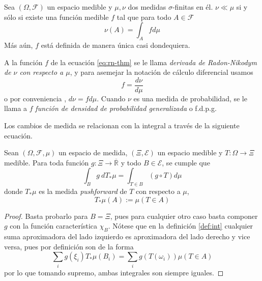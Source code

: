 \documentclass[main.tex]{subfiles}
\begin{document}
\begin{theorem}
Sea $(\Omega, \mathcal{F})$ un espacio medible y $\mu, \nu$ dos medidas $\sigma$-finitas en él. $\nu \ll \mu$ si y sólo si existe una función medible $f$ tal que para todo $A \in \mathcal{F}$
\begin{equation}\label{eq:rn-thm}
	\nu(A) = \int_A f d\mu
\end{equation}
Más aún, $f$ está definida de manera única casi dondequiera.
\end{theorem}

\begin{definition}
A la función $f$ de la ecuación \eqref{eq:rn-thm} se le llama \textit{derivada de Radon-Nikodym de $\nu$ con respecto a $\mu$}, y para asemejar la notación de cálculo diferencial usamos 
\begin{equation*}
f = \frac{d\nu}{d\mu}	
\end{equation*}
o por conveniencia , $d\nu = fd\mu$. Cuando $\nu$ es una medida de probabilidad, se le llama a $f$ \textit{función de densidad de probabilidad generalizada} o f.d.p.g.
\end{definition}

Los cambios de medida se relacionan con la integral a través de la siguiente ecuación.

\begin{lemma}\label{lemma:trans-int}
	Sean $(\Omega, \mathcal{F}, \mu)$ un espacio de medida, $(\Xi, \mathcal{E})$ un espacio medible y $T:\Omega \to \Xi$ medible. Para toda función $g:\Xi \to \overline{\mathbb{R}}$ y todo $B\in\mathcal{E}$, se cumple que
	\begin{equation*}
		\int _Bg\ dT_*\mu=\int_{T\in B}(g\circ T)d\mu
	\end{equation*} 
	donde $T_*\mu$ es la medida \textit{pushforward} de $T$ con respecto a $\mu$,  
	\begin{equation*}
		T_*\mu(A):=\mu(T\in A)
	\end{equation*}
\end{lemma}
\begin{proof}
Basta probarlo para $B=\Xi$, pues para cualquier otro caso basta componer $g$ con la función característica $\chi_B$. Nótese que en la definición \ref{def:int} cualquier suma aproximadora del lado izquierdo es aproximadora del lado derecho y vice versa, pues por definición son de la forma
\begin{equation*}
	\sum_i g(\xi_i)T_*\mu(B_i) = \sum_i g\left(T(\omega_i)\right)\mu(T \in A)
\end{equation*}
por lo que tomando supremo, ambas integrales son siempre iguales.
\end{proof}
\end{document}
